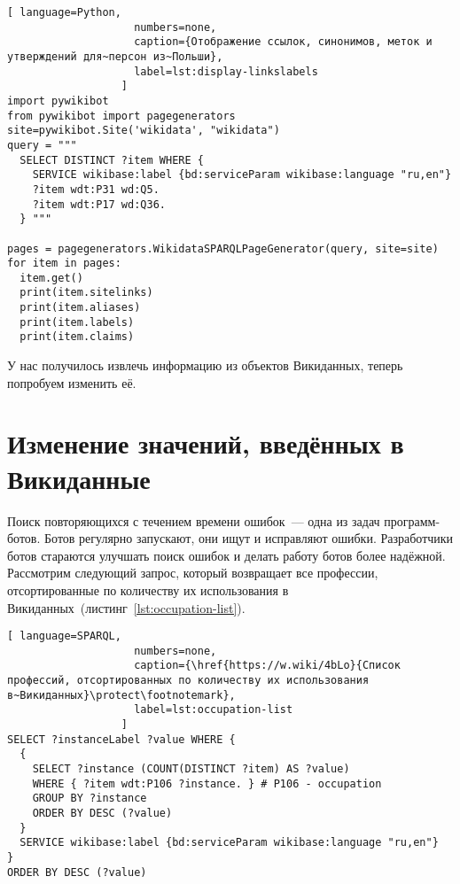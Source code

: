 \newpage
\begin{lstlisting}[ language=Python,
                    numbers=none,
                    caption={Отображение ссылок, синонимов, меток и утверждений для~персон из~Польши},
                    label=lst:display-linkslabels
                  ]
import pywikibot
from pywikibot import pagegenerators
site=pywikibot.Site('wikidata', "wikidata")
query = """
  SELECT DISTINCT ?item WHERE {
    SERVICE wikibase:label {bd:serviceParam wikibase:language "ru,en"}
    ?item wdt:P31 wd:Q5.
    ?item wdt:P17 wd:Q36.
  } """

pages = pagegenerators.WikidataSPARQLPageGenerator(query, site=site)
for item in pages:
  item.get()
  print(item.sitelinks)
  print(item.aliases)
  print(item.labels)
  print(item.claims)
\end{lstlisting} 


У нас получилось извлечь информацию из объектов Викиданных, теперь попробуем изменить её. 




\section{Изменение значений, введённых в Викиданные}
\label{sec:modifying the values entered in Wikidata}

Поиск повторяющихся с течением времени ошибок~--- одна из задач программ-ботов. 
Ботов регулярно запускают, они ищут и исправляют ошибки. 
Разработчики ботов стараются улучшать поиск ошибок и делать работу ботов более надёжной. 
Рассмотрим следующий запрос, который возвращает все профессии, 
отсортированные по количеству их использования в Викиданных~(листинг~\ref{lst:occupation-list}).



\newpage
\begin{lstlisting}[ language=SPARQL,
                    numbers=none,
                    caption={\href{https://w.wiki/4bLo}{Cписок профессий, отсортированных по количеству их использования в~Викиданных}\protect\footnotemark},
                    label=lst:occupation-list
                  ]
SELECT ?instanceLabel ?value WHERE {
  {
    SELECT ?instance (COUNT(DISTINCT ?item) AS ?value) 
    WHERE { ?item wdt:P106 ?instance. } # P106 - occupation
    GROUP BY ?instance
    ORDER BY DESC (?value)
  }
  SERVICE wikibase:label {bd:serviceParam wikibase:language "ru,en"}
}
ORDER BY DESC (?value)
\end{lstlisting} 

